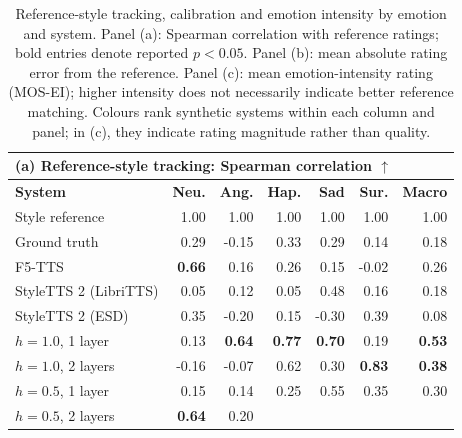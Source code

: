 \begin{table}[p]
\centering
\caption[Reference-style tracking, calibration and emotion intensity]{Reference-style tracking, calibration and emotion intensity by emotion and system. Panel (a): Spearman correlation with reference ratings; bold entries denote reported $p<0.05$. Panel (b): mean absolute rating error from the reference. Panel (c): mean emotion-intensity rating (MOS-EI); higher intensity does not necessarily indicate better reference matching. Colours rank synthetic systems within each column and panel; in (c), they indicate rating magnitude rather than quality.}
\label{tab:emotion_combined}
\label{tab:emotion_corr}
\label{tab:emotion_mae}
\label{tab:emotion_mosei}
\small
\setlength{\tabcolsep}{5pt}
\renewcommand{\arraystretch}{1.05}
\begin{tabular}{lrrrrrr}
\toprule
\multicolumn{7}{l}{\textbf{(a) Reference-style tracking: Spearman correlation $\uparrow$}} \\
\midrule
    \textbf{System}
    & \textbf{Neu.}
    & \textbf{Ang.}
    & \textbf{Hap.}
    & \textbf{Sad}
    & \textbf{Sur.}
    & \textbf{Macro} \\
    \midrule
    Style reference & 1.00 & 1.00 & 1.00 & 1.00 & 1.00 & 1.00 \\
    Ground truth
    & 0.29 & -0.15 & 0.33 & 0.29 & 0.14 & 0.18 \\
    F5-TTS
    & \cellcolor{bestblue}\textbf{0.66}
    & 0.16
    & 0.26
    & 0.15
    & \cellcolor{worstred}-0.02
    & 0.26 \\
    StyleTTS 2 (LibriTTS)
    & 0.05
    & 0.12
    & \cellcolor{worstred}0.05
    & 0.48
    & 0.16
    & 0.18 \\
    StyleTTS 2 (ESD)
    & 0.35
    & \cellcolor{worstred}-0.20
    & 0.15
    & \cellcolor{worstred}-0.30
    & 0.39
    & \cellcolor{worstred}0.08 \\
    $h=1.0$, 1 layer
    & 0.13
    & \cellcolor{bestblue}\textbf{0.64}
    & \cellcolor{bestblue}\textbf{0.77}
    & \cellcolor{bestblue}\textbf{0.70}
    & 0.19
    & \cellcolor{bestblue}\textbf{0.53} \\
    $h=1.0$, 2 layers
    & \cellcolor{worstred}-0.16
    & -0.07
    & 0.62
    & 0.30
    & \cellcolor{bestblue}\textbf{0.83}
    & \textbf{0.38} \\
    $h=0.5$, 1 layer
    & 0.15
    & 0.14
    & 0.25
    & \cellcolor{secondorange}0.55
    & 0.35
    & 0.30 \\
    $h=0.5$, 2 layers
    & \cellcolor{secondorange}\textbf{0.64}
    & \cellcolor{secondorange}0.20

\end{tabular}
\end{table}
